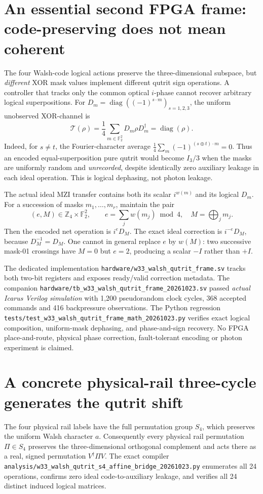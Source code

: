 \documentclass[10pt]{article}
\begin{document}
\section{An essential second FPGA frame: code-preserving does not mean coherent}
The four Walsh-code logical actions preserve the
three-dimensional subspace, but \emph{different}
XOR mask values implement different qutrit sign operations.
A controller that tracks only the common optical
$i$-phase cannot recover arbitrary logical superpositions.
For $D_m=\operatorname{diag}((-1)^{s\cdot m})_{s=1,2,3}$,
the uniform unobserved XOR-channel is
\[
 \mathcal T(\rho)=\frac14\sum_{m\in\mathbb F_2^2}
 D_m\rho D_m^\dagger=\operatorname{diag}(\rho).
\]
Indeed, for $s\ne t$, the Fourier-character average
$\frac14\sum_m(-1)^{(s\oplus t)\cdot m}=0$.
Thus an encoded equal-superposition pure qutrit
would become $I_3/3$ when the masks are uniformly
random and \emph{unrecorded}, despite identically
zero auxiliary leakage in each ideal operation.
This is logical dephasing, not photon leakage.

The actual ideal MZI transfer contains both
its scalar $i^{w(m)}$ and its logical $D_m$.
For a succession of masks $m_1,\ldots,m_r$,
maintain the pair
\[
 (e,M)\in\mathbb Z_4\times\mathbb F_2^2,\qquad
 e=\sum_jw(m_j)\bmod4,\quad M=\bigoplus_jm_j.
\]
Then the encoded net operation is $i^e D_M$.
The exact ideal correction is $i^{-e}D_M$,
because $D_M^{-1}=D_M$. One cannot in general
replace $e$ by $w(M)$: two successive mask-01
crossings have $M=0$ but $e=2$, producing a
scalar $-I$ rather than $+I$.

The dedicated implementation
\texttt{hardware/w33\_walsh\_qutrit\_frame.sv}
tracks both two-bit registers and exposes
ready/valid correction metadata. The companion
\texttt{hardware/tb\_w33\_walsh\_qutrit\_frame\_20261023.sv}
passed \emph{actual Icarus Verilog simulation} with
1,200 pseudorandom clock cycles, 368 accepted
commands and 416 backpressure observations.
The Python regression
\texttt{tests/test\_w33\_walsh\_qutrit\_frame\_math\_20261023.py}
verifies exact logical composition, uniform-mask
dephasing, and phase-and-sign recovery.
No FPGA place-and-route, physical phase correction,
fault-tolerant encoding or photon experiment is claimed.

\section{A concrete physical-rail three-cycle generates the qutrit shift}
The four physical rail labels have the full permutation group
$S_4$, which preserves the uniform Walsh character $a$.
Consequently every physical rail permutation $\Pi\in S_4$
preserves the three-dimensional orthogonal complement
and acts there as a real, signed permutation $V^\dagger\Pi V$.
The exact compiler
\texttt{analysis/w33\_walsh\_qutrit\_s4\_affine\_bridge\_20261023.py}
enumerates all 24 operations, confirms zero ideal
code-to-auxiliary leakage, and verifies all 24 distinct
induced logical matrices.
\end{document}
